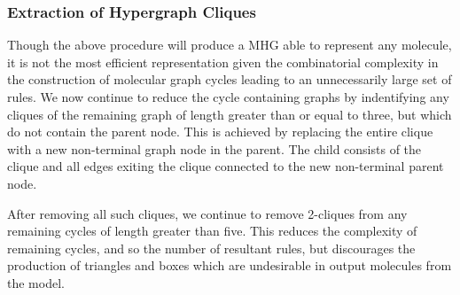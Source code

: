 \documentclass{article}
\begin{document}

\subsubsection{Extraction of Hypergraph Cliques}\label{sec:cliques}
Though the above procedure will produce a MHG able to represent any molecule, it is not the most efficient representation given the combinatorial complexity in the construction of molecular graph cycles leading to an unnecessarily large set of rules. We now continue to reduce the cycle containing graphs by indentifying any cliques of the remaining graph of length greater than or equal to three, but which do not contain the parent node. This is achieved by replacing the entire clique with a new non-terminal graph node in the parent. The child consists of the clique and all edges exiting the clique connected to the new non-terminal parent node.

After removing all such cliques, we continue to remove 2-cliques from any remaining cycles of length greater than five. This reduces the complexity of remaining cycles, and so the number of resultant rules, but discourages the production of triangles and boxes which are undesirable in output molecules from the model.
\end{document}

